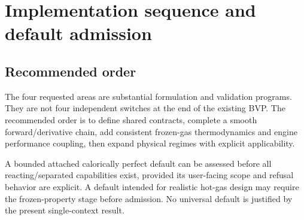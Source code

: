 \section{Implementation sequence and default admission}
\label{sec:plan}
\subsection{Recommended order}
The four requested areas are substantial formulation and validation
programs. They are not four independent switches at the end of the
existing BVP. The recommended order is to define shared contracts,
complete a smooth forward/derivative chain, add consistent frozen-gas
thermodynamics and engine performance coupling, then expand physical
regimes with explicit applicability.

A bounded attached calorically perfect default can be assessed before
all reacting/separated capabilities exist, provided its user-facing
scope and refusal behavior are explicit. A default intended for realistic
hot-gas design may require the frozen-property stage before admission.
No universal default is justified by the present single-context result.

